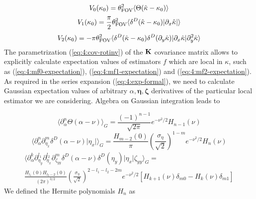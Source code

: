 \begin{equation}
\label{eq:4:mf0-expectation}
V_0(\kappa_0) = \theta_{\rm FOV}^2\langle\Theta(\hat{\kappa}-\kappa_0)\rangle
\end{equation} 
%
\begin{equation}
\label{eq:4:mf1-expectation}
V_1(\kappa_0) = \frac{\pi}{2}\theta_{\rm FOV}^2\langle\delta^D(\hat{\kappa}-\kappa_0)\vert\partial_x\hat{\kappa}\vert\rangle
\end{equation} 
%
\begin{equation}
\label{eq:4:mf2-expectation}
V_2(\kappa_0) = -\pi\theta_{\rm FOV}^2\langle\delta^D(\hat{\kappa}-\kappa_0)\delta^D(\partial_y\hat{\kappa})\vert\partial_x\hat{\kappa}\vert\partial^2_y\hat{\kappa}\rangle
\end{equation}
%
The parametrization (\ref{eq:4:cov-rotinv}) of the $\mathbf{K}$ covariance matrix allows to explicitly calculate expectation values of estimators $f$ which are local in $\kappa$, such as (\ref{eq:4:mf0-expectation}), (\ref{eq:4:mf1-expectation}) and (\ref{eq:4:mf2-expectation}). As required in the series expansion (\ref{eq:4:exp-formal}), we need to calculate Gaussian expectation values of arbitrary $\alpha,\pmb{\eta},\pmb{\zeta}$ derivatives of the particular local estimator we are considering. Algebra on Gaussian integration leads to

\begin{equation}
\label{eq:4:Rv0}
\langle\partial_\alpha^n\Theta(\alpha-\nu)\rangle_G = \frac{(-1)^{n-1}}{\sqrt{2\pi}}e^{-\nu^2/2}H_{n-1}(\nu) 
\end{equation}
%
\begin{equation}
\label{eq:4:Rv1}
\langle\partial_\alpha^n\partial_{\eta_x}^m\delta^D(\alpha-\nu)\vert\eta_x\vert\rangle_G = \frac{H_{m-2}(0)}{\pi}\left(\frac{\sigma_\eta}{\sqrt{2}}\right)^{1-m}e^{-\nu^2/2}H_n(\nu) 
\end{equation} 
%
\hfill
\begin{equation}
\label{eq:4:Rv2}
\begin{gathered}
\langle\partial_\alpha^k\partial_{\eta_y}^{l_1}\partial_{\eta_x}^{l_2}\partial_{\zeta_{yy}}^m\delta^D(\alpha-\nu)\delta^D(\eta_y)\vert\eta_x\vert\zeta_{yy}\rangle_G = \\
\frac{H_{l_1}(0)H_{l_2-2}(0)}{(2\pi)^{3/2}}\left(\frac{\sigma_\eta}{\sqrt{2}}\right)^{2-l_1-l_2-2m}e^{-\nu^2/2}[H_{k+1}(\nu)\delta_{m0}-H_k(\nu)\delta_{m1}]
\end{gathered} 
\end{equation} 
%
We defined the Hermite polynomials $H_n$ as 

